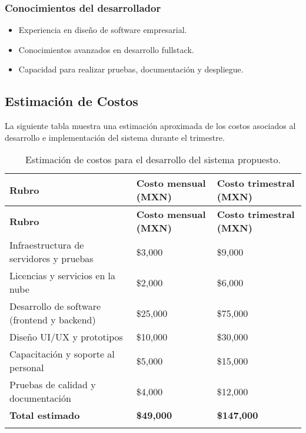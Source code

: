 \subsubsection{Conocimientos del desarrollador}
\begin{itemize}
	\item Experiencia en diseño de software empresarial.
	\item Conocimientos avanzados en desarrollo fullstack.
	\item Capacidad para realizar pruebas, documentación y despliegue.
\end{itemize}

\subsection{Estimación de Costos}

La siguiente tabla muestra una estimación aproximada de los costos asociados al desarrollo e implementación del sistema durante el trimestre.

\begin{longtable}{|p{}|p{}|p{}|}
	\hline
	\textbf{Rubro}                              & \textbf{Costo mensual (MXN)} & \textbf{Costo trimestral (MXN)} \\
	\hline
	\endfirsthead

	\hline
	\textbf{Rubro}                              & \textbf{Costo mensual (MXN)} & \textbf{Costo trimestral (MXN)} \\
	\hline
	\endhead

	Infraestructura de servidores y pruebas     & \$3,000                      & \$9,000                         \\
	\hline
	Licencias y servicios en la nube            & \$2,000                      & \$6,000                         \\
	\hline
	Desarrollo de software (frontend y backend) & \$25,000                     & \$75,000                        \\
	\hline
	Diseño UI/UX y prototipos                   & \$10,000                     & \$30,000                        \\
	\hline
	Capacitación y soporte al personal          & \$5,000                      & \$15,000                        \\
	\hline
	Pruebas de calidad y documentación          & \$4,000                      & \$12,000                        \\
	\hline
	\textbf{Total estimado}                     & \textbf{\$49,000}            & \textbf{\$147,000}              \\
	\hline
	\caption{Estimación de costos para el desarrollo del sistema propuesto.}
	\label{tabla:costos}
\end{longtable}

